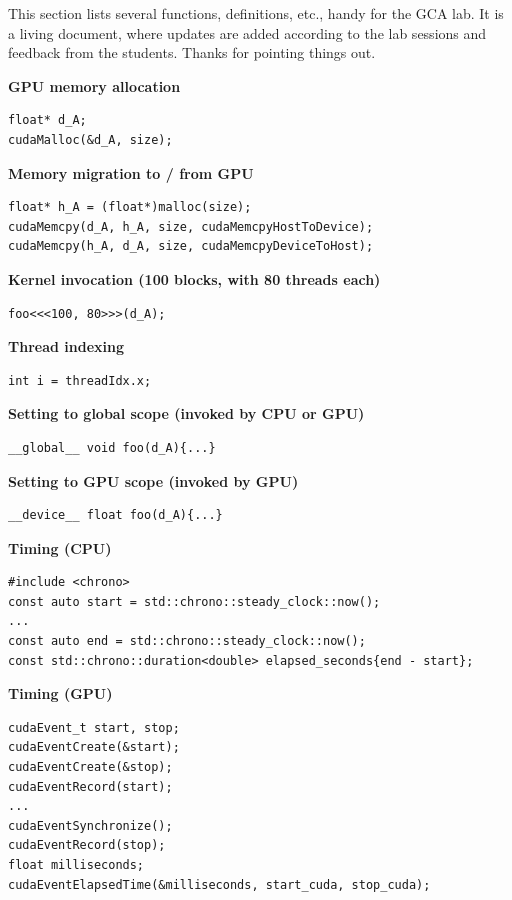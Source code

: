 This section lists several functions, definitions, etc., handy for the GCA lab. It is a living document, where updates are added according to the lab sessions and feedback from the students. Thanks for pointing things out.

\textbf{GPU memory allocation}
\begin{lstlisting}[language=CUDA,numbers=none]
float* d_A;
cudaMalloc(&d_A, size);
\end{lstlisting}

\textbf{Memory migration to / from GPU}
\begin{lstlisting}[language=CUDA,numbers=none]
float* h_A = (float*)malloc(size);
cudaMemcpy(d_A, h_A, size, cudaMemcpyHostToDevice);
cudaMemcpy(h_A, d_A, size, cudaMemcpyDeviceToHost);
\end{lstlisting}

\textbf{Kernel invocation (100 blocks, with 80 threads each)}
\begin{lstlisting}[language=CUDA,numbers=none]
foo<<<100, 80>>>(d_A);
\end{lstlisting}

\textbf{Thread indexing}
\begin{lstlisting}[language=CUDA,numbers=none]
int i = threadIdx.x;
\end{lstlisting}

\textbf{Setting to global scope (invoked by CPU or GPU)}
\begin{lstlisting}[language=CUDA,numbers=none]
__global__ void foo(d_A){...}
\end{lstlisting}

\textbf{Setting to GPU scope (invoked by GPU)}
\begin{lstlisting}[language=CUDA,numbers=none]
__device__ float foo(d_A){...}
\end{lstlisting}

\textbf{Timing (CPU)}
\begin{lstlisting}[language=CUDA,numbers=none]
#include <chrono>
const auto start = std::chrono::steady_clock::now();
...
const auto end = std::chrono::steady_clock::now();
const std::chrono::duration<double> elapsed_seconds{end - start};
\end{lstlisting}

\textbf{Timing (GPU)}
\begin{lstlisting}[language=CUDA,numbers=none]
cudaEvent_t start, stop;
cudaEventCreate(&start);
cudaEventCreate(&stop);
cudaEventRecord(start);
...
cudaEventSynchronize();
cudaEventRecord(stop);
float milliseconds;
cudaEventElapsedTime(&milliseconds, start_cuda, stop_cuda);
\end{lstlisting}
